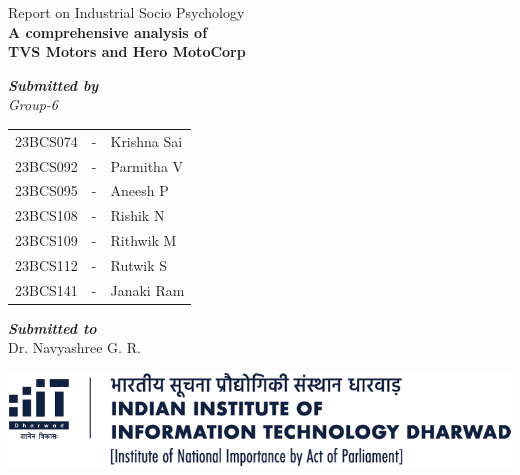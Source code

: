 \begin{titlepage}
\begin{singlespace}
\begin{center}
	{\LARGE Report on Industrial Socio Psychology}
	\\[2cm]
	{\Huge \textbf{A comprehensive analysis of\\[0.4cm] TVS Motors and Hero MotoCorp}}\\[2.3cm]
	{\Large 
	\textbf{\textit{Submitted by}}\\[0.75cm]
	\textit{Group-6}\\[0.4cm]
	
	\begin{tabular}{ccl}
		23BCS074 & - & Krishna Sai \\
		23BCS092 & - & Parmitha V \\
		23BCS095 & - & Aneesh P \\
		23BCS108 & - & Rishik N \\
		23BCS109 & - & Rithwik M \\
		23BCS112 & - & Rutwik S \\
		23BCS141 & - & Janaki Ram \\[1.5cm]
	\end{tabular}


	\textbf{\textit{Submitted to}}\\[0.75cm]
	Dr. Navyashree G. R.}
	
	\vfill
	\includegraphics[width=0.8\linewidth]{psycho_images/logo-full-light.png}
	
\end{center}
\end{singlespace}	
\end{titlepage}